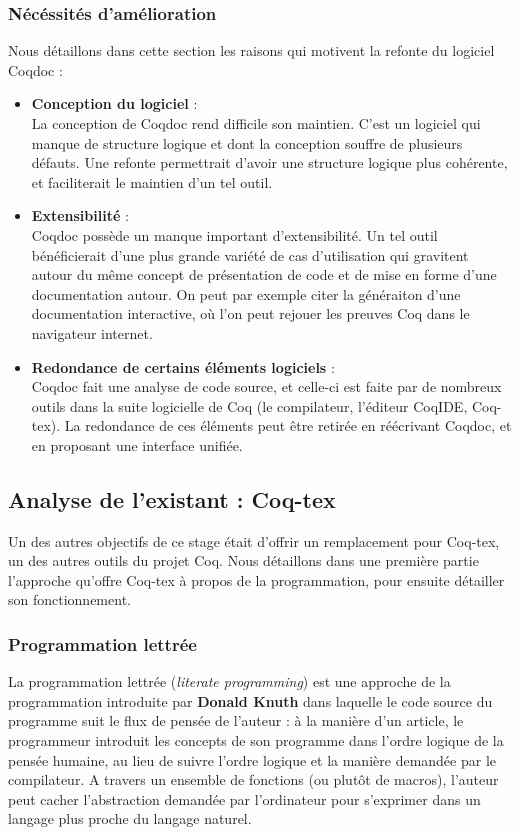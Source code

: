 \documentclass[a4paper, 11pt]{report}
\begin{document}
    \subsubsection{Nécéssités d'amélioration}
    Nous détaillons dans cette section les raisons qui motivent la refonte
    du logiciel Coqdoc :
    \begin{itemize}
      \item \textbf{Conception du logiciel} : \\
        La conception de Coqdoc rend difficile son maintien. C'est un logiciel
        qui manque de structure logique et dont la conception souffre de
        plusieurs défauts. Une refonte permettrait d'avoir une structure
        logique plus cohérente, et faciliterait le maintien d'un tel outil.
      \item \textbf{Extensibilité} : \\
        Coqdoc possède un manque important d'extensibilité. Un tel outil
        bénéficierait d'une plus grande variété de cas d'utilisation qui
        gravitent autour du même concept de présentation de code et de mise
        en forme d'une documentation autour. On peut par exemple citer
        la généraiton d'une documentation interactive, où l'on peut rejouer
        les preuves Coq dans le navigateur internet.
      \item \textbf{Redondance de certains éléments logiciels} : \\
        Coqdoc fait une analyse de code source, et celle-ci est faite par de
        nombreux outils dans la suite logicielle de Coq (le compilateur,
        l'éditeur CoqIDE, Coq-tex). La redondance de ces éléments peut être
        retirée en réécrivant Coqdoc, et en proposant une interface unifiée.
    \end{itemize}

    \subsection{Analyse de l'existant : Coq-tex}
    Un des autres objectifs de ce stage était d'offrir un remplacement pour
    Coq-tex, un des autres outils du projet Coq. Nous détaillons dans une
    première partie l'approche qu'offre Coq-tex à propos de la programmation,
    pour ensuite détailler son fonctionnement.

    \subsubsection{Programmation lettrée}
    La programmation lettrée (\textit{literate programming}) est une approche
    de la programmation introduite par \textbf{Donald Knuth} dans laquelle
    le code source du programme suit le flux de pensée de l'auteur : à la
    manière d'un article, le programmeur introduit les concepts de son
    programme dans l'ordre logique de la pensée humaine, au lieu de suivre
    l'ordre logique et la manière demandée par le compilateur. A travers un
    ensemble de fonctions (ou plutôt de macros), l'auteur peut cacher
    l'abstraction demandée par l'ordinateur pour s'exprimer dans un langage
    plus proche du langage naturel.
\end{document}
